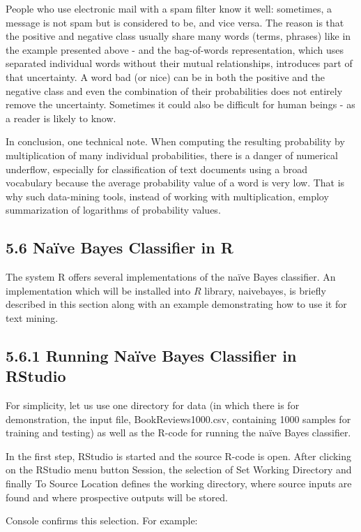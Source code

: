 \documentclass[10pt]{book}
\begin{document}
People who use electronic mail with a spam filter know it well: sometimes, a message is not spam but is considered to be, and vice versa. The reason is that the positive and negative class usually share many words (terms, phrases) like in the example presented above - and the bag-of-words representation, which uses separated individual words without their mutual relationships, introduces part of that uncertainty. A word bad (or nice) can be in both the positive and the negative class and even the combination of their probabilities does not entirely remove the uncertainty. Sometimes it could also be difficult for human beings - as a reader is likely to know.

In conclusion, one technical note. When computing the resulting probability by multiplication of many individual probabilities, there is a danger of numerical underflow, especially for classification of text documents using a broad vocabulary because the average probability value of a word is very low. That is why such data-mining tools, instead of working with multiplication, employ summarization of logarithms of probability values.

\subsection*{5.6 Naïve Bayes Classifier in R}
The system R offers several implementations of the naïve Bayes classifier. An implementation which will be installed into $R$ library, naivebayes, is briefly\\
described in this section along with an example demonstrating how to use it for text mining.

\subsection*{5.6.1 Running Naïve Bayes Classifier in RStudio}
For simplicity, let us use one directory for data (in which there is for demonstration, the input file, BookReviews1000.csv, containing 1000 samples for training and testing) as well as the R-code for running the naïve Bayes classifier.

In the first step, RStudio is started and the source R-code is open. After clicking on the RStudio menu button Session, the selection of Set Working Directory and finally To Source Location defines the working directory, where source inputs are found and where prospective outputs will be stored.

Console confirms this selection. For example:
\end{document}
